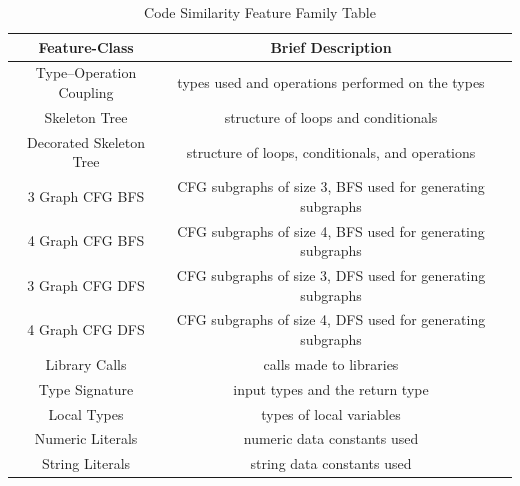 \begin{table}[h]
\centering
\begin{threeparttable}[b]
\caption{Code Similarity Feature Family Table}
\label{table:search-similarity}
\begin{tabular}{ccc} \toprule
    {Feature-Class} & {Brief Description} \\ \midrule
Type–Operation Coupling & types used and operations performed on the types \\
Skeleton Tree & structure of loops and conditionals \\
Decorated Skeleton Tree & structure of loops, conditionals, and operations \\
3 Graph CFG BFS & CFG subgraphs of size 3, BFS used for generating subgraphs \\
4 Graph CFG BFS & CFG subgraphs of size 4, BFS used for generating subgraphs \\
3 Graph CFG DFS & CFG subgraphs of size 3, DFS used for generating subgraphs \\
4 Graph CFG DFS & CFG subgraphs of size 4, DFS used for generating subgraphs \\
Library Calls & calls made to libraries \\
Type Signature & input types and the return type \\
Local Types & types of local variables \\
Numeric Literals & numeric data constants used \\
String Literals & string data constants used \\
\bottomrule
\end{tabular}
\end{threeparttable}
\end{table}

